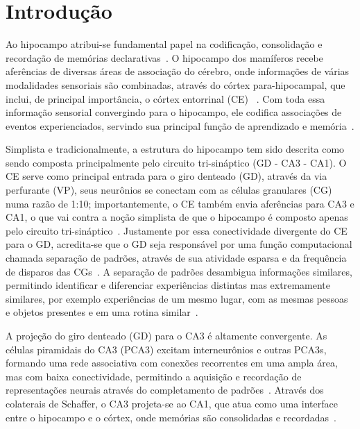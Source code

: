 \chapter{Introdução}

Ao hipocampo atribui-se fundamental papel na codificação, consolidação e recordação de memórias declarativas~\cite{eichenbaumHippocampus1999}. O
hipocampo dos mamíferos recebe aferências de diversas áreas de associação do cérebro, onde informações de várias modalidades
sensoriais são combinadas, através do córtex para-hipocampal, que inclui, de principal importância, o córtex entorrinal (CE)
~\cite{eichenbaumCortical2000}. Com toda essa informação sensorial convergindo para o hipocampo, ele codifica associações de eventos
experienciados, servindo sua principal função de aprendizado e memória~\cite{berdugo-vegaSharpening2023, henkeModel2010}.

Simplista e tradicionalmente, a estrutura do hipocampo tem sido descrita como sendo composta principalmente pelo circuito
tri-sináptico (GD - CA3 - CA1). O CE serve como principal entrada para o giro denteado (GD), através da via perfurante (VP), seus
neurônios se conectam com as células granulares (CG) numa razão de 1:10; importantemente, o CE também envia aferências para CA3 e
CA1, o que vai contra a noção simplista de que o hipocampo é composto apenas pelo circuito tri-sináptico~\cite{basuCorticohippocampal2015}.
Justamente por essa conectividade divergente do CE para o GD, acredita-se que o GD seja responsável por uma função
computacional chamada separação de padrões, através de sua atividade esparsa e da frequência de disparos das CGs~\cite{hainmuellerDentate2020, kesnerMnemonic2006, yassaPattern2011}.
A separação de padrões desambigua informações similares, permitindo
identificar e diferenciar experiências distintas mas extremamente similares, por exemplo experiências de um mesmo lugar, com as
mesmas pessoas e objetos presentes e em uma rotina similar~\cite{eichenbaumHippocampus2004}.

A projeção do giro denteado (GD) para o CA3 é altamente convergente. As células piramidais do CA3 (PCA3) excitam interneurônios e
outras PCA3s, formando uma rede associativa com conexões recorrentes em uma ampla área, mas com baixa conectividade, permitindo a
aquisição e recordação de representações neurais através do completamento de padrões~\cite{leduigouRecurrent2014}. Através dos
colaterais de Schaffer, o CA3 projeta-se ao CA1, que atua como uma interface entre o hipocampo e o córtex, onde memórias são
consolidadas e recordadas~\cite{bartschCA12011}.

